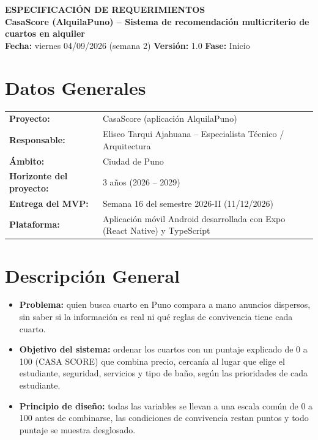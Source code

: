 \documentclass[11pt,a4paper]{article}
\begin{document}
\begin{center}
    {\Large \textbf{\textcolor{AzulUNA}{ESPECIFICACIÓN DE REQUERIMIENTOS}}}\\[3pt]
    {\normalsize \textbf{CasaScore (AlquilaPuno) -- Sistema de recomendación multicriterio de cuartos en alquiler}}\\[4pt]
    \footnotesize \textbf{Fecha:} viernes 04/09/2026 (semana 2) \quad \textbar\quad \textbf{Versión:} 1.0 \quad \textbar\quad \textbf{Fase:} Inicio
\end{center}

\vspace{0.1cm}

\section{Datos Generales}
\noindent\begin{tabularx}{\textwidth}{@{}P{4.2cm} L@{}}
\toprule
\textbf{Proyecto:} & CasaScore (aplicación AlquilaPuno) \\
\textbf{Responsable:} & Eliseo Tarqui Ajahuana -- Especialista Técnico / Arquitectura \\
\textbf{Ámbito:} & Ciudad de Puno \\
\textbf{Horizonte del proyecto:} & 3 años (2026 -- 2029) \\
\textbf{Entrega del MVP:} & Semana 16 del semestre 2026-II (11/12/2026) \\
\textbf{Plataforma:} & Aplicación móvil Android desarrollada con Expo (React Native) y TypeScript \\
\bottomrule
\end{tabularx}

\section{Descripción General}
\begin{itemize}[leftmargin=*]
    \item \textbf{Problema:} quien busca cuarto en Puno compara a mano anuncios dispersos, sin saber si la información es real ni qué reglas de convivencia tiene cada cuarto.
    \item \textbf{Objetivo del sistema:} ordenar los cuartos con un puntaje explicado de 0 a 100 (CASA SCORE) que combina precio, cercanía al lugar que elige el estudiante, seguridad, servicios y tipo de baño, según las prioridades de cada estudiante.
    \item \textbf{Principio de diseño:} todas las variables se llevan a una escala común de 0 a 100 antes de combinarse, las condiciones de convivencia restan puntos y todo puntaje se muestra desglosado.
\end{itemize}
\end{document}
